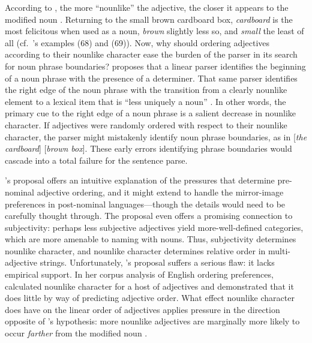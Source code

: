 \documentclass[preprint,authoryear]{elsarticle}\frenchspacing
\begin{document}
According to \citeauthor{bever1970}, the more ``nounlike'' the adjective, the closer it appears to the modified noun \citep[see also][]{biberetal1999,posner1986}. Returning to the small brown cardboard box, \emph{cardboard} is the most felicitous when used as a noun, \emph{brown} slightly less so, and \emph{small} the least of all (cf.~\citeauthor{bever1970}'s examples (68) and (69)). 
%
%
%
Now, why should ordering adjectives according to their nounlike character ease the burden of the parser in its search for noun phrase boundaries? \citeauthor{bever1970} proposes that a linear parser identifies the beginning of a noun phrase with the presence of a determiner. That same parser identifies the right edge of the noun phrase with the transition from a clearly nounlike element to a lexical item that is ``less uniquely a noun'' \citep[p.~323]{bever1970}. In other words, the primary cue to the right edge of a noun phrase is a salient decrease in nounlike character. If adjectives were randomly ordered with respect to their nounlike character, the parser might mistakenly identify noun phrase boundaries, as in [\emph{the cardboard}] [\emph{brown box}]. These early errors identifying phrase boundaries would cascade into a total failure for the sentence parse.

\citeauthor{bever1970}'s proposal offers an intuitive explanation of the pressures that determine pre-nominal adjective ordering, and it might extend to handle the mirror-image preferences in post-nominal languages---though the details would need to be carefully thought through. The proposal even offers a promising connection to subjectivity: perhaps less subjective adjectives yield more-well-defined categories, which are more amenable to naming with nouns. Thus, subjectivity determines nounlike character, and nounlike character determines relative order in multi-adjective strings. Unfortunately, \citeauthor{bever1970}'s proposal suffers a serious flaw: it lacks empirical support. In her corpus analysis of English ordering preferences, \cite{wulff2003} %
calculated nounlike character for a host of adjectives and demonstrated that it does little by way of predicting adjective order. What effect nounlike character does have on the linear order of adjectives applies pressure in the direction opposite of \citeauthor{bever1970}'s hypothesis: more nounlike adjectives are marginally more likely to occur \emph{farther} from the modified noun \citep[p.~255]{wulff2003}.
\end{document}
